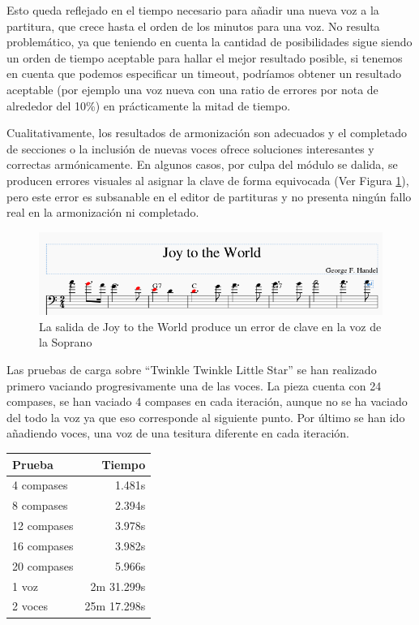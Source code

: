 Esto queda reflejado en el tiempo necesario para añadir una nueva voz a la partitura, que crece hasta el orden de los minutos para una voz. No resulta problemático, ya que teniendo en cuenta la cantidad de posibilidades sigue siendo un orden de tiempo aceptable para hallar el mejor resultado posible, si tenemos en cuenta que podemos especificar un timeout, podríamos obtener un resultado aceptable (por ejemplo una voz nueva con una ratio de errores por nota de alrededor del 10\%) en prácticamente la mitad de tiempo.

Cualitativamente, los resultados de armonización son adecuados y el completado de secciones o la inclusión de nuevas voces ofrece soluciones interesantes y correctas armónicamente. En algunos casos, por culpa del módulo se dalida, se producen errores visuales al asignar la clave de forma equivocada (Ver Figura \ref{fig:joy_harm_err}), pero este error es subsanable en el editor de partituras y no presenta ningún fallo real en la armonización ni completado. 

\begin{figure}
    	\centering
    	\includegraphics[width=0.9\linewidth]{imagenes/evaluation/joy_harm_err.png}
    	\caption{La salida de Joy to the World produce un error de clave en la voz de la Soprano}
    	\label{fig:joy_harm_err}
\end{figure}

Las pruebas de carga sobre ``Twinkle Twinkle Little Star'' se han realizado primero vaciando progresivamente una de las voces. La pieza cuenta con 24 compases, se han vaciado 4 compases en cada iteración, aunque no se ha vaciado del todo la voz ya que eso corresponde al siguiente punto. Por último se han ido añadiendo voces, una voz de una tesitura diferente en cada iteración.
\begin{center}
	\begin{tabular}{ | l | r | }
		\hline
		Prueba & Tiempo \\ \hline
		4 compases  & 1.481s \\ \hline
		8 compases 	& 2.394s \\ \hline
		12 compases	& 3.978s \\ \hline
		16 compases & 3.982s \\ \hline
		20 compases & 5.966s \\ \hline
		1 voz & 2m 31.299s \\ \hline
		2 voces & 25m 17.298s  \\ \hline
	\end{tabular}
\end{center}


